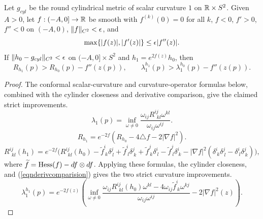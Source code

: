 \begin{lemma}
  \label{lem:kl-surgery-pinching-condition-ricci-flow-surgery-lemma}
\label{lemroundoff}
Let $g_{cyl}$ be the round cylindrical metric of scalar curvature $1$ on
${\mathbb R}\times S^2$. Given $A>0$, let $f:(-A,0]\rightarrow{\mathbb R}$ be smooth with
$f^{(k)}(0)=0$ for all $k$, $f<0$, $f'>0$, $f''<0$ on $(-A,0)$,
$\|f\|_{C^2}<\epsilon$, and
\begin{equation}
\label{eqnderivcomparision}
\max\{|f(z)|,|f'(z)|\}\leq\epsilon|f''(z)|.
\end{equation}
If $\|h_0-g_{cyl}\|_{C^2}<\epsilon$ on $(-A,0]\times S^2$ and
$h_1=e^{2f(z)}h_0$, then
\[
R_{h_1}(p)>R_{h_0}(p)-f''(z(p)),\qquad
\lambda_1^{h_1}(p)>\lambda_1^{h_0}(p)-f''(z(p)).
\]
\end{lemma}
\begin{proof}
\sketch The conformal scalar-curvature and curvature-operator formulas below,
combined with the cylinder closeness and derivative comparison, give the
claimed strict improvements.
\begin{equation} \label{Rvar}
\lambda_1(p)=\inf_{\omega\ne0}
\frac{\omega_{ij}R^{ij}_{\ \ kl}\omega^{kl}}{\omega_{ij}\omega^{ij}}.
\end{equation}
\begin{equation} \label{confscalar}
R_{h_1}=e^{-2f}(R_{h_0}-4\triangle f-2|\nabla f|^2).
\end{equation}
\begin{equation} \label{confcurv}
R^{ij}_{\ \ kl}(h_1)=e^{-2f}\bigl(R^{ij}_{\ \ kl}(h_0)
-\widetilde f^i_{\ k}\delta^j_{\ l}+\widetilde f^i_{\ l}\delta^j_{\ k}
+\widetilde f^j_{\ k}\delta^i_{\ l}-\widetilde f^j_{\ l}\delta^i_{\ k}
-|\nabla f|^2(\delta^i_{\ k}\delta^j_{\ l}-\delta^i_{\ l}\delta^j_{\ k})\bigr),
\end{equation}
where $\widetilde f=\operatorname{Hess}(f)-df\otimes df$. Applying these formulas,
the cylinder closeness, and (\ref{eqnderivcomparision}) gives the two
strict curvature improvements.
\begin{equation} \label{min1}
\lambda_1^{h_1}(p)=e^{-2f(z)}\left(\inf_{\omega\ne0}
\frac{\omega_{ij}R^{ij}_{\ \ kl}(h_0)\omega^{kl}
-4\omega_{ij}\widetilde f^i_{\ k}\omega^{kj}}{\omega_{ij}\omega^{ij}}
-2|\nabla f|^2(z)\right).
\end{equation}
\end{proof}

